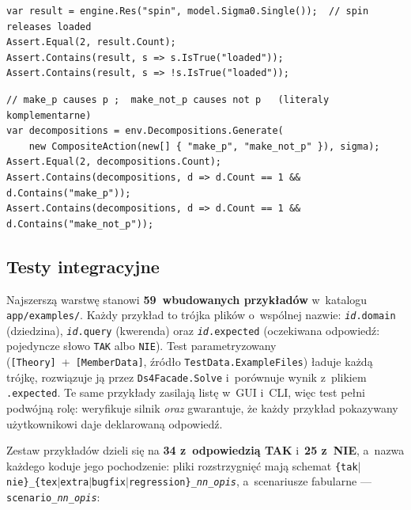 \documentclass[11pt,a4paper]{article}
\begin{document}
\begin{lstlisting}[style=ds4code, caption={Reguła releases daje niedeterminizm w~funkcji Res}]
var result = engine.Res("spin", model.Sigma0.Single());  // spin releases loaded
Assert.Equal(2, result.Count);
Assert.Contains(result, s => s.IsTrue("loaded"));
Assert.Contains(result, s => !s.IsTrue("loaded"));
\end{lstlisting}

\begin{lstlisting}[style=ds4code, caption={Konflikt rozkłada akcję złożoną na jednoelementowe dekompozycje}]
// make_p causes p ;  make_not_p causes not p   (literaly komplementarne)
var decompositions = env.Decompositions.Generate(
    new CompositeAction(new[] { "make_p", "make_not_p" }), sigma);
Assert.Equal(2, decompositions.Count);
Assert.Contains(decompositions, d => d.Count == 1 && d.Contains("make_p"));
Assert.Contains(decompositions, d => d.Count == 1 && d.Contains("make_not_p"));
\end{lstlisting}

\subsection{Testy integracyjne}

Najszerszą warstwę stanowi \textbf{59~wbudowanych przykładów} w~katalogu
\texttt{app/examples/}. Każdy przykład to trójka plików o~wspólnej nazwie:
\texttt{\textit{id}.domain} (dziedzina), \texttt{\textit{id}.query}
(kwerenda) oraz \texttt{\textit{id}.expected} (oczekiwana odpowiedź: pojedyncze
słowo \texttt{TAK} albo \texttt{NIE}). Test parametryzowany
(\texttt{[Theory]}~+~\texttt{[MemberData]}, źródło \texttt{TestData.ExampleFiles})
ładuje każdą trójkę, rozwiązuje ją przez \texttt{Ds4Facade.Solve}
i~porównuje wynik z~plikiem \texttt{.expected}. Te same przykłady zasilają
listę w~GUI i~CLI, więc test pełni podwójną rolę: weryfikuje silnik
\emph{oraz} gwarantuje, że każdy przykład pokazywany użytkownikowi daje
deklarowaną odpowiedź.

Zestaw przykładów dzieli się na \textbf{34 z~odpowiedzią TAK} i~\textbf{25 z~NIE},
a~nazwa każdego koduje jego pochodzenie: pliki rozstrzygnięć mają schemat
\texttt{\{tak$|$nie\}\_\{tex$|$extra$|$bugfix$|$regression\}\_\textit{nn}\_\textit{opis}},
a~scenariusze fabularne --- \texttt{scenario\_\textit{nn}\_\textit{opis}}:
\end{document}
